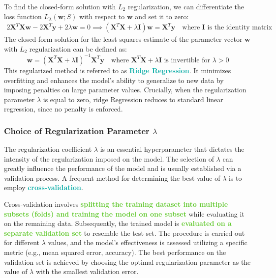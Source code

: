 \documentclass[twoside]{article}
\newcommand{\highlightbluetext}[1]{\textcolor[HTML]{09ACA6}{\textbf{#1}}}
\newcommand{\highlightgreentext}[1]{\textcolor[HTML]{62C92F}{\textbf{#1}}}
\numberwithin{equation}{section}
\begin{document}
	To find the closed-form solution with $L_2$ regularization, we can differentiate the loss function $L_{\lambda}(\mathbf{w}; S)$ with respect to $\mathbf{w}$ and set it to zero:
	\begin{align*}
		2 \mathbf{X}^T \mathbf{X} \mathbf{w} - 2 \mathbf{X}^T \mathbf{y} + 2 \lambda \mathbf{w} = 0 \implies (\mathbf{X}^T \mathbf{X} + \lambda \mathbf{I}) \mathbf{w} = \mathbf{X}^T \mathbf{y} \quad \text{where } \mathbf{I} \text{ is the identity matrix}
	\end{align*}
	The closed-form solution for the least squares estimate of the parameter vector $\mathbf{w}$ with $L_2$ regularization can be defined as:
	\begin{equation}
	\label{eq:RegularizedClosedFormSolution}
	\boxed{\mathbf{w} = (\mathbf{X}^T \mathbf{X} + \lambda \mathbf{I})^{-1} \mathbf{X}^T \mathbf{y}} \quad \text{where } \mathbf{X}^T \mathbf{X} + \lambda \mathbf{I} \text{ is invertible for } \lambda > 0
	\end{equation}
	This regularized method is referred to as \highlightbluetext{Ridge Regression}. It minimizes overfitting and enhances the model's ability to generalize to new data by imposing penalties on large parameter values. Crucially, when the regularization parameter $\lambda$ is equal to zero, ridge Regression reduces to standard linear regression, since no penalty is enforced.

	\subsubsection{Choice of Regularization Parameter $\lambda$}
	\label{subsubsec:ChoiceOfRegularizationParameter}
	The regularization coefficient $\lambda$ is an essential hyperparameter that dictates the intensity of the regularization imposed on the model. The selection of $\lambda$ can greatly influence the performance of the model and is usually established via a validation process. A frequent method for determining the best value of $\lambda$ is to employ \highlightbluetext{cross-validation}.

	Cross-validation involves \highlightgreentext{splitting the training dataset into multiple subsets (folds) and training the model on one subset} while evaluating it on the remaining data. Subsequently, the trained model is \highlightgreentext{evaluated on a separate validation set} to resemble the test set. The procedure is carried out for different $\lambda$ values, and the model's effectiveness is assessed utilizing a specific metric (e.g., mean squared error, accuracy). The best performance on the validation set is achieved by choosing the optimal regularization parameter as the value of $\lambda$ with the smallest validation error.
\end{document}
